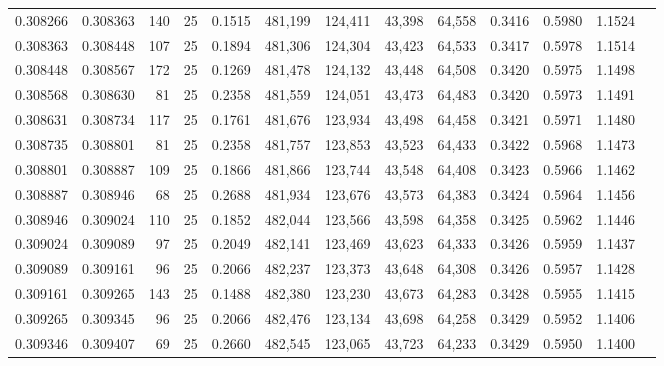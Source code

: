 \begin{tabular}{rrrrrrrrrrrrr}
0.308266 & 0.308363 &   140 &  25 &                                     0.1515 & 481,199 & 124,411 &  43,398 &  64,558 & 0.3416 & 0.5980 & 1.1524 \\
0.308363 & 0.308448 &   107 &  25 &                                     0.1894 & 481,306 & 124,304 &  43,423 &  64,533 & 0.3417 & 0.5978 & 1.1514 \\
0.308448 & 0.308567 &   172 &  25 &                                     0.1269 & 481,478 & 124,132 &  43,448 &  64,508 & 0.3420 & 0.5975 & 1.1498 \\
0.308568 & 0.308630 &    81 &  25 &                                     0.2358 & 481,559 & 124,051 &  43,473 &  64,483 & 0.3420 & 0.5973 & 1.1491 \\
0.308631 & 0.308734 &   117 &  25 &                                     0.1761 & 481,676 & 123,934 &  43,498 &  64,458 & 0.3421 & 0.5971 & 1.1480 \\
0.308735 & 0.308801 &    81 &  25 &                                     0.2358 & 481,757 & 123,853 &  43,523 &  64,433 & 0.3422 & 0.5968 & 1.1473 \\
0.308801 & 0.308887 &   109 &  25 &                                     0.1866 & 481,866 & 123,744 &  43,548 &  64,408 & 0.3423 & 0.5966 & 1.1462 \\
0.308887 & 0.308946 &    68 &  25 &                                     0.2688 & 481,934 & 123,676 &  43,573 &  64,383 & 0.3424 & 0.5964 & 1.1456 \\
0.308946 & 0.309024 &   110 &  25 &                                     0.1852 & 482,044 & 123,566 &  43,598 &  64,358 & 0.3425 & 0.5962 & 1.1446 \\
0.309024 & 0.309089 &    97 &  25 &                                     0.2049 & 482,141 & 123,469 &  43,623 &  64,333 & 0.3426 & 0.5959 & 1.1437 \\
0.309089 & 0.309161 &    96 &  25 &                                     0.2066 & 482,237 & 123,373 &  43,648 &  64,308 & 0.3426 & 0.5957 & 1.1428 \\
0.309161 & 0.309265 &   143 &  25 &                                     0.1488 & 482,380 & 123,230 &  43,673 &  64,283 & 0.3428 & 0.5955 & 1.1415 \\
0.309265 & 0.309345 &    96 &  25 &                                     0.2066 & 482,476 & 123,134 &  43,698 &  64,258 & 0.3429 & 0.5952 & 1.1406 \\
0.309346 & 0.309407 &    69 &  25 &                                     0.2660 & 482,545 & 123,065 &  43,723 &  64,233 & 0.3429 & 0.5950 & 1.1400 \\

\end{tabular}
